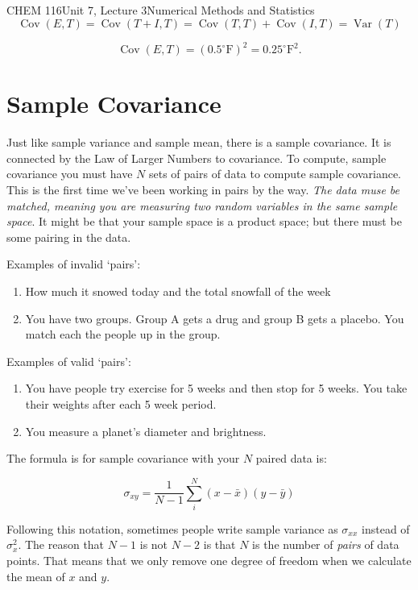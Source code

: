\documentclass{article}
\DeclareMathOperator{\Var}{Var}
\DeclareMathOperator{\Cov}{Cov}
\begin{document}
\begin{tdoc}{CHEM 116}{Unit 7, Lecture 3}{Numerical Methods and Statistics}
\[
\Cov(E, T) = \Cov(T + I, T) = \Cov(T, T) + \Cov(I, T) = \Var(T)
\]

\[
\Cov(E, T) = (0.5^\circ \textrm{F})^2 = 0.25 ^\circ \textrm{F}^2.
\]

\section{Sample Covariance}

Just like sample variance and sample mean, there is a sample
covariance. It is connected by the Law of Larger Numbers to covariance. To compute, sample covariance you must have $N$ sets of pairs of data to compute sample
covariance. This is the first time we've been working in pairs by the
way. \textit{The data muse be matched, meaning you are measuring two random
variables in the same sample space}. It might be that your sample space
is a product space; but there must be some pairing in the data.

Examples of invalid `pairs':

\begin{enumerate}

\item How much it snowed today and the total snowfall of the week

\item You have two groups. Group A gets a drug and group B gets a
  placebo. You match each the people up in the group.

\end{enumerate}

Examples of valid `pairs':

\begin{enumerate}

  \item You have people try exercise for 5 weeks and then stop for 5
    weeks. You take their weights after each 5 week period.

    \item You measure a planet's diameter and brightness.

\end{enumerate}


The formula is for sample covariance with your $N$ paired data is:

\begin{equation}
  \sigma_{xy}= \frac{1}{N - 1} \sum_i^N (x - \bar{x})(y - \bar{y})
\end{equation}

Following this notation, sometimes people write sample variance as
$\sigma_{xx}$ instead of $\sigma_x^2$. The reason that $N - 1$ is not
$N - 2$ is that $N$ is the number of {\it pairs} of data points. That
means that we only remove one degree of freedom when we calculate the
mean of $x$ and $y$.


\end{tdoc}
\end{document}
